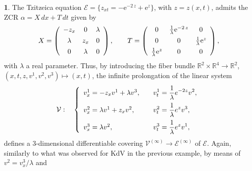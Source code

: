 \documentclass[12pt,english]{elsarticle}
\theoremstyle{plain}
\theoremstyle{plain}
\theoremstyle{remark}
\theoremstyle{plain}
\theoremstyle{definition}
\theoremstyle{definition}
\newtheorem{example}[thm]{\protect\examplename}
\providecommand{\examplename}{Example}
\begin{document}
\begin{example}
\label{Covering_TZ}
The Tzitzeica equation
$\mathcal{E}=\{z_{xt}=-{{\mathrm{e}}^{-2\,z}}+{{\mathrm{e}}^{z}}\}$, with
$z=z(x,t)$, admits the ZCR $\alpha =X\,dx+T\,dt$ given by \cite{Brez}
%
\begin{equation*}
X=\left (
%
\begin{array}{c@{\quad}c@{\quad}c}
-z_{x} & 0 & \lambda
\\
\noalign{\vspace{4pt}}\lambda & z_{x} & 0
\\
\noalign{\vspace{4pt}}
0 & \lambda & 0
\end{array}
%
\right ),\qquad T=\left ({\displaystyle
%
\begin{array}{c@{\quad}c@{\quad}c}
0 & \frac{1}{\lambda}{{\mathrm{e}}^{-2\,z}} & 0
\\
\noalign{\vspace{4pt}}
0 & 0 & \frac{1}{\lambda}{{\mathrm{e}}^{z}}
\\
\noalign{\vspace{4pt}}
\frac{1}{\lambda}{{\mathrm{e}}^{z}} & 0 & 0
\end{array}
%
}\right ),
\end{equation*}
%
with $\lambda $ a real parameter. Thus, by introducing the fiber bundle
$\mathbb{R}^{2}\times \mathbb{R}^{4}\rightarrow \mathbb{R}^{2}$,
$(x,t,z,v^{1},v^{2},v^{3})\allowbreak \mapsto (x,t)$, the infinite prolongation of
the linear system
%
\begin{equation}
\mathcal{V}:\quad \left \{
%
\begin{array}{l@{\quad}l@{\quad}l}
v_{x}^{1}=-z_{x}v^{1}+\lambda v^{3}, &
\vspace{5pt}
& {\displaystyle v_{t}^{1}=\frac{1}{\lambda}e^{-2z}v^{2}},
\\
v_{x}^{2}=\lambda v^{1}+z_{x}v^{2}, &
\vspace{5pt}
& {\displaystyle v_{t}^{2}=\frac{1}{\lambda}e^{z}v^{3}},
\\
v_{x}^{3}=\lambda v^{2}, & & {\displaystyle v_{t}^{3}=
\frac{1}{\lambda}e^{z}v^{1}},
\end{array}
%
\right .
\label{Lin_cov_TZ}
\end{equation}
%
defines a $3$-dimensional differentiable covering
$\mathcal{V}^{(\infty )}\longrightarrow \mathcal{E}^{(\infty )}$ of
$\mathcal{E}$. Again, similarly to what was observed for KdV in the previous
example, by means of $v^{2}=v_{x}^{3}/\lambda $ and

\end{example}
\end{document}
